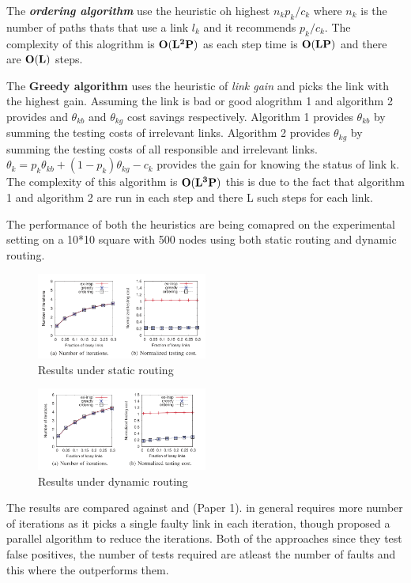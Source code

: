 \documentclass[10pt]{sigplan-proc-varsize}
\begin{document}
The {\it {\bf ordering algorithm}} use the heuristic oh highest $n_kp_k/c_k$ where $n_k$ is the number of paths thats that use a link $l_k$ and it recommends $p_k/c_k$. The complexity of this alogrithm is ${\bf O(L^2P)}$ as each step time is ${\bf O(LP)}$ and there are ${\bf O(L)}$ steps.

The {\bf Greedy algorithm} uses the heuristic  of {\it link gain} and picks the link with the highest gain. Assuming the link is bad or good alogrithm 1 and algorithm 2 provides  and ${\theta}_{kb}$ and ${\theta}_{kg}$ cost savings respectively. Algorithm 1 provides ${\theta}_{kb}$ by summing the testing costs of irrelevant links.  Algorithm 2 provides ${\theta}_{kg}$ by summing the testing costs of all responsible and irrelevant links.
${\theta}_{k}  = p_k{\theta}_{kb} + (1-p_k){\theta}_{kg}-c_k$ provides the gain for knowing the status of link k. The complexity of this algorithm is ${\bf O(L^3P)}$ this is due to the fact that algorithm 1 and algorithm 2 are run in each step and there L such steps for each link.

The performance of both the heuristics are being comapred on the experimental setting on a 10*10 square with 500 nodes using both static routing and dynamic routing. 

\begin{figure}[h!]
  \caption{Results under static routing}
  \centering
    \includegraphics[width=0.5\textwidth]{Fig19}
\end{figure}

\begin{figure}[h!]
  \caption{Results under dynamic routing}
  \centering
    \includegraphics[width=0.5\textwidth]{Fig20}
\end{figure}

The results are compared against \cite{Duff:06} and \cite{pclee:07} (Paper 1). \cite{pclee:07} in general requires more number of iterations as it picks a single faulty link in each iteration, though \cite{pclee:07} proposed a parallel algorithm to reduce the iterations. Both of the approaches since they test false positives, the number of tests required are atleast the number of faults and this where the \cite{krishna:12} outperforms them. 
\end{document}
